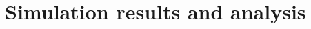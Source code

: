 \documentclass[a4paper,fleqn]{cas-dc}
\begin{document}







\section{Simulation results and analysis}\label{Result}



\end{document}
